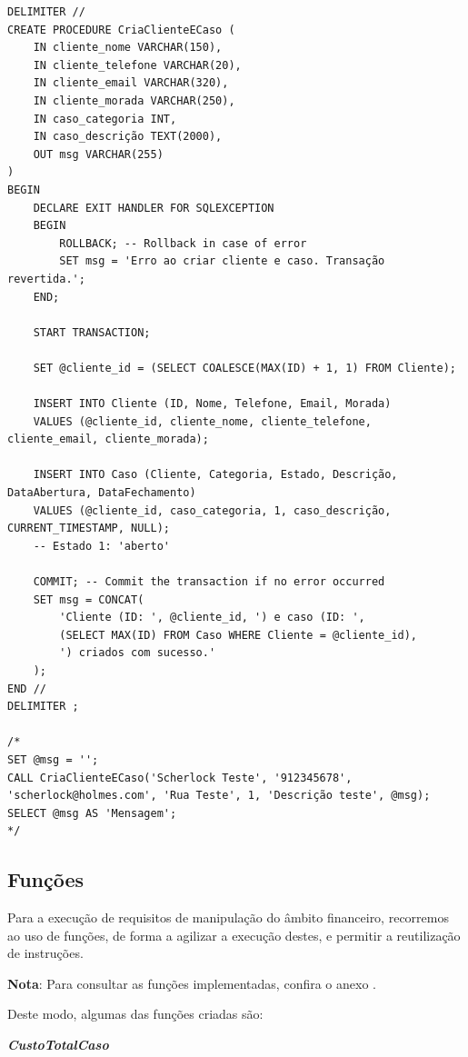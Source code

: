 \documentclass[a4paper,12pt]{scrreprt}
\begin{document}
\vspace{0.4cm}
\begin{lstlisting}[escapechar=!]
DELIMITER //
CREATE PROCEDURE CriaClienteECaso (
    IN cliente_nome VARCHAR(150),
    IN cliente_telefone VARCHAR(20),
    IN cliente_email VARCHAR(320),
    IN cliente_morada VARCHAR(250),
    IN caso_categoria INT,
    IN caso_descrição TEXT(2000),
    OUT msg VARCHAR(255)
)
BEGIN
    DECLARE EXIT HANDLER FOR SQLEXCEPTION
    BEGIN
        ROLLBACK; -- Rollback in case of error
        SET msg = 'Erro ao criar cliente e caso. Transação revertida.';
    END;

    START TRANSACTION;

    SET @cliente_id = (SELECT COALESCE(MAX(ID) + 1, 1) FROM Cliente);

    INSERT INTO Cliente (ID, Nome, Telefone, Email, Morada)
    VALUES (@cliente_id, cliente_nome, cliente_telefone, cliente_email, cliente_morada);

    INSERT INTO Caso (Cliente, Categoria, Estado, Descrição, DataAbertura, DataFechamento)
    VALUES (@cliente_id, caso_categoria, 1, caso_descrição, CURRENT_TIMESTAMP, NULL);
    -- Estado 1: 'aberto'

    COMMIT; -- Commit the transaction if no error occurred
    SET msg = CONCAT(
        'Cliente (ID: ', @cliente_id, ') e caso (ID: ',
        (SELECT MAX(ID) FROM Caso WHERE Cliente = @cliente_id),
        ') criados com sucesso.'
    );
END //
DELIMITER ;

/*
SET @msg = '';
CALL CriaClienteECaso('Scherlock Teste', '912345678', 'scherlock@holmes.com', 'Rua Teste', 1, 'Descrição teste', @msg);
SELECT @msg AS 'Mensagem';
*/
\end{lstlisting}

\clearpage

\subsection{Funções}

Para a execução de requisitos de manipulação do âmbito financeiro, recorremos ao uso de funções, de forma a agilizar a execução destes, e permitir a reutilização de instruções. 

\textbf{Nota}: Para consultar as funções implementadas, confira o anexo \textit{}.

Deste modo, algumas das funções criadas são:

\textit{\textbf{CustoTotalCaso}}
\end{document}
